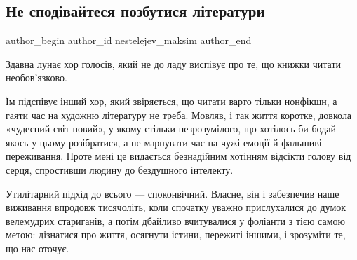  
 
 
 
 
\subsection{Не сподівайтеся позбутися літератури}
\label{sec:08_12_2021.stz.news.ua.tyzhden.1.literatura}

\ifcmt
 author_begin
   author_id nestelejev_maksim
 author_end
\fi

Здавна лунає хор голосів, який не до ладу виспівує про те, що книжки читати
необов’язково.

Їм підспівує інший хор, який звіряється, що читати варто тільки нонфікшн, а
гаяти час на художню літературу не треба. Мовляв, і так життя коротке, довкола
«чудесний світ новий», у якому стільки незрозумілого, що хотілось би бодай
якось у цьому розібратися, а не марнувати час на чужі емоції й фальшиві
переживання. Проте мені це видається безнадійним хотінням відсікти голову від
серця, спростивши людину до бездушного інтелекту.

Утилітарний підхід до всього — споконвічний. Власне, він і забезпечив наше
виживання впродовж тисячоліть, коли спочатку уважно прислухалися до думок
велемудрих стариганів, а потім дбайливо вчитувалися у фоліанти з тією самою
метою: дізнатися про життя, осягнути істини, пережиті іншими, і зрозуміти те,
що нас оточує.

\zzrule

